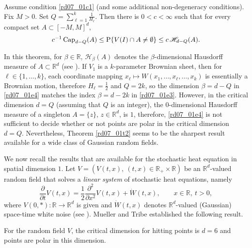 \documentclass[12pt,a4paper]{article}
\newcommand{\R}{{\mathbb{R}}}
\renewcommand{\P}{\mathrm{P}}
\newcommand{\<}{\langle}
\renewcommand{\>}{\rangle}
\begin{document}
\begin{theorem}\label{rd07_01t2}
   Assume condition \eqref{rd07_01c1} (and some additional non-degeneracy conditions). Fix $M > 0$. Set
$
   Q = \sum_{\ell=1}^k \frac{1}{H_\ell}.
$
Then there is $0<c<\infty$ such that for every compact set $A\subset [-M, M]^d$,
\begin{equation}\label{rd07_01e4}
   c^{-1}\, \mbox{\rm Cap}_{d-Q}(A) \leq \P\{V(I) \cap A \neq \emptyset\} \leq c\, \mathscr{H}_{d-Q}(A).
\end{equation}
\end{theorem}

In this theorem, for $\beta \in \R$, $\mathscr{H}_\beta(A)$ denotes the $\beta$-dimensional Hausdorff measure of $A \subset \R^d$ (see \cite[Appendix C]{khosh}). If $V_1$ is a $k$-parameter Brownian sheet, then for $\ell \in \{1,\dots, k\}$, each coordinate mapping $x_\ell \mapsto W(x_1,\dots, x_\ell, \dots, x_k)$ is essentially a Brownian motion, therefore $H_\ell = \frac 1 2$ and $Q = 2k$, so the dimension $\beta = d - Q$ in \eqref{rd07_01e4} matches the index $\beta = d - 2k$ in \eqref{rd07_01e3}. However, in the critical dimension $d= Q$ (assuming that $Q$ is an integer), the $0$-dimensional Hausdorff measure of a singleton $A = \{z\}$, $z \in \R^d$, is $1$, therefore, \eqref{rd07_01e4} is not sufficient to decide whether or not points are polar in the critical dimension $d = Q$. Nevertheless, Theorem \ref{rd07_01t2} seems to be the sharpest result available for a wide class of Gaussian random fields.

We now recall the results that are available for the stochastic heat equation in spatial dimension $1$. Let $V = (V(t,x),\ (t,x) \in \R_+ \times \R)$ be an $\R^d$-valued random field that solves a {\em linear system} of stochastic heat equations, namely 
\begin{equation}\label{rd07_01e5}
  \frac{\partial}{\partial t}  V(t,x) = \frac12\frac{\partial^2}{\partial x^2} V(t,x) + \dot W(t,x), \qquad x \in \R,\ t >0,
\end{equation}
where $V(0, *): \R \to \R^d$ is given and $\dot W(t,x)$ denotes $\R^d$-valued (Gaussian) space-time white noise (see \cite[Chapter 1]{dss}). Mueller and Tribe \cite{muellertribe} established the following result.

\begin{theorem}\label{rd07_01t3}
For the random field $V$, the critical dimension for hitting points is $d=6$ and points are polar in this dimension.
\end{theorem}
\end{document}
